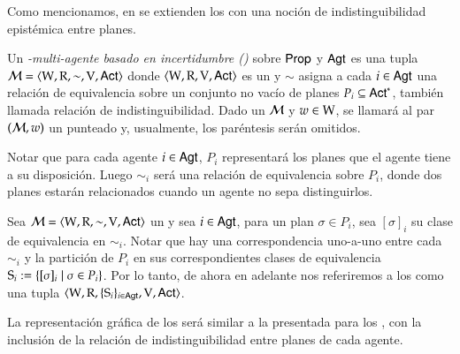 Como mencionamos, en \cite{ArecesFSV25,SaraviaPHD} se extienden los \lts con una noción de indistinguibilidad epistémica entre planes.

\begin{definicion}
    Un \emph{\lts-multi-agente basado en incertidumbre (\ults)} sobre $\PROP$ y $\AGT$ es una tupla $\model = \tup{\W,\R,\sim,\V,\ACT}$ 
    donde $\tup{\W,\R,\V,\ACT}$ es un \lts y $\sim$ asigna a cada $i \in \AGT$ una relación de equivalencia sobre un conjunto no vacío 
    de planes $P_i \subseteq \ACT^*$, también llamada relación de indistinguibilidad. Dado un \ults $\modults$ y $w \in \W$, se llamará 
    al par $(\modults,w)$ un \ults punteado y, usualmente, los paréntesis serán omitidos.
\end{definicion}

Notar que para cada agente $i \in \AGT$, $P_i$ representará los planes que el agente tiene a su disposición. 
Luego $\sim_i$ será una relación de equivalencia sobre $P_i$, donde dos planes estarán relacionados cuando un agente no sepa distinguirlos.

Sea $\model = \tup{\W,\R,\sim,\V,\ACT}$ un \ults y sea $i \in \AGT$, para un plan $\sigma \in P_i$, sea $[\sigma]_i$ su clase de 
equivalencia en $\sim_i$. Notar que hay una correspondencia uno-a-uno entre cada $\sim_i$ y la partición de $P_i$ en sus correspondientes 
clases de equivalencia $\S_i := \{[\sigma]_i \mid \sigma \in P_i\}$. Por lo tanto, de ahora en adelante nos referiremos a los \ults como
una tupla $\tup{\W,\R,\{\S_i\}_{i \in \AGT},\V,\ACT}$.

La representación gráfica de los \ultss será similar a la presentada para los \ltss, con la inclusión de la relación de indistinguibilidad 
entre planes de cada agente.

